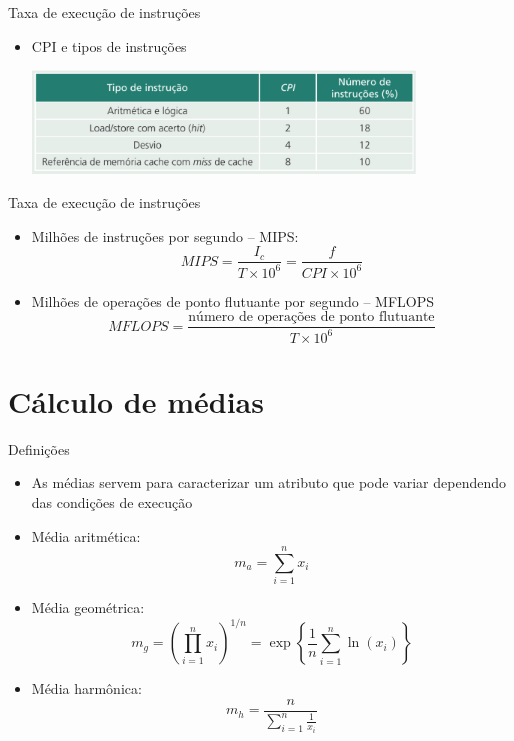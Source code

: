 \begin{slide}{Taxa de execução de instruções}
	\begin{itemize}
		\item {CPI e tipos de instruções}
			\begin{center}
				\includegraphics[width=0.8\textwidth]{figs/cpi} 
			\end{center} 
	\end{itemize}
\end{slide}

\begin{slide}{Taxa de execução de instruções}
\begin{itemize}
   \item Milhões de instruções por segundo -- MIPS:
	   \begin{equation*}
		   MIPS = \frac{I_c}{T\times 10^6} = \frac{f}{CPI\times 10^6}
	   \end{equation*}
   \item Milhões de operações de ponto flutuante por segundo -- MFLOPS
	   \begin{equation*}
		   MFLOPS = \frac{\text{número de operações de ponto flutuante}}{T\times 10^6}
	   \end{equation*}
\end{itemize} 
\end{slide}

\section[slide=true]{Cálculo de médias}
\begin{slide}{Definições}
	\begin{itemize}
		\item As médias servem para caracterizar um atributo que pode variar dependendo das condições de execução
		\item Média aritmética:
			\begin{equation*}
				m_a = \sum_{i=1}^n x_i
			\end{equation*}
		\item Média geométrica:
			\begin{equation*}
				m_g = \left (\prod_{i=1}^n  x_i \right )^{1/n} = \exp \left \{ \frac{1}{n}\sum_{i=1}^n \ln \left ( x_i \right ) \right \}
			\end{equation*}
		\item Média harmônica:
			\begin{equation*}
				m_h = \frac{n}{ \sum\limits_{i=1}^n \frac{1}{x_i}  }
			\end{equation*}
	\end{itemize}
\end{slide}


